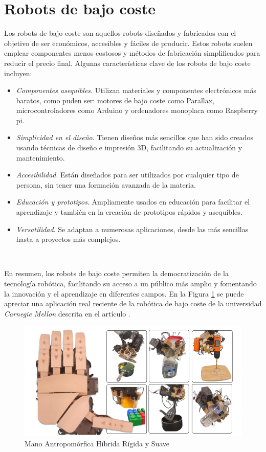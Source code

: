 \section{Robots de bajo coste}

Los robots de bajo coste son aquellos robots diseñados y fabricados con el objetivo de ser económicos, accesibles y fáciles de producir. Estos robots suelen emplear componentes menos costosos y métodos de fabricación simplificados para reducir el precio final. Algunas características clave de los robots de bajo coste incluyen:

\begin{itemize}
	\item \textit{Componentes asequibles}. Utilizan materiales y componentes electrónicos más baratos, como puden ser: motores de bajo coste como Parallax, microcontroladores como Arduino y ordenadores monoplaca como Raspberry pi.
	\item \textit{Simplicidad en el diseño}. Tienen diseños más sencillos que han sido creados usando técnicas de diseño e impresión 3D, facilitando su actualización y mantenimiento.
	\item \textit{Accesibilidad}. Están diseñados para ser utilizados por cualquier tipo de persona, sin tener una formación avanzada de la materia.
	\item \textit{Educación y prototipos}. Ampliamente usados en educación para facilitar el aprendizaje y también en la creación de prototipos rápidos y asequibles.
	\item \textit{Versatilidad}. Se adaptan a numerosas aplicaciones, desde las más sencillas hasta a proyectos más complejos.
	
\end{itemize}\

En resumen, los robots de bajo coste permiten la democratización de la tecnología robótica, facilitando su acceso a un público más amplio y fomentando la innovación y el aprendizaje en diferentes campos. En la Figura \ref{fig:roblowcost} se puede apreciar una aplicación real reciente de la robótica de bajo coste de la universidad \textit{Carnegie Mellon} descrita en el artículo \cite{shaw2024leap}.\\ 

\begin{figure} [h!]
	\begin{center}
		\includegraphics[width=16cm]{figs/handlowcost.png}
	\end{center}
	\caption{Mano Antropomórfica Híbrida Rígida y Suave} %
	\label{fig:roblowcost}
\end{figure}\

